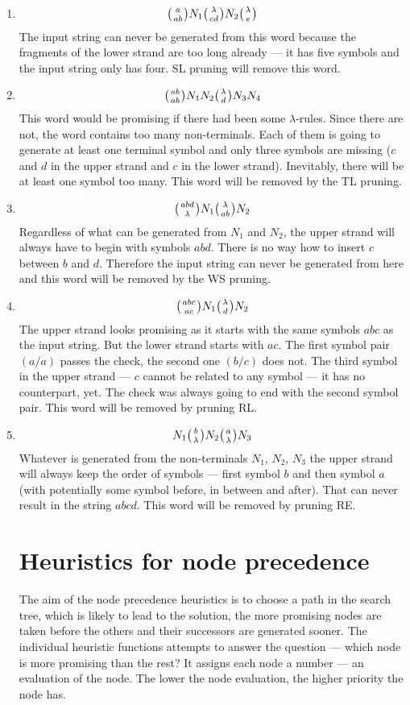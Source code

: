 \begin{enumerate}
\item{
$$\wkpair{a}{ab} N_1 \wkpair{\lambda}{cd} N_2 \wkpair{\lambda}{e}$$
The input string can never be generated from this word because the fragments of the lower strand are too long already --- it has five symbols and the input string only has four. SL pruning will remove this word.
}
\item{
$$\wkpair{ab}{ab} N_1 N_2 \wkpair{\lambda}{d} N_3 N_4$$
This word would be promising if there had been some $\lambda$-rules. Since there are not, the word contains too many non-terminals. Each of them is going to generate at least one terminal symbol and only three symbols are missing ($c$ and $d$ in the upper strand and $c$ in the lower strand). Inevitably, there will be at least one symbol too many. This word will be removed by the TL pruning.
}
\item{
$$\wkpair{abd}{\lambda} N_1 \wkpair{\lambda}{ab} N_2$$
Regardless of what can be generated from $N_1$ and $N_2$, the upper strand will always have to begin with symbols $abd$. There is no way how to insert $c$ between $b$ and $d$. Therefore the input string can never be generated from here and this word will be removed by the WS pruning.
}
\item{
$$\wkpair{abc}{ac} N_1 \wkpair{\lambda}{d} N_2$$
The upper strand looks promising as it starts with the same symbols $abc$ as the input string. But the lower strand starts with $ac$. The first symbol pair $(a/a)$ passes the check, the second one $(b/c)$ does not. The third symbol in the upper strand --- $c$ cannot be related to any symbol --- it has no counterpart, yet. The check was always going to end with the second symbol pair. This word will be removed by pruning RL.
}
\item{
$$N_1 \wkpair{b}{\lambda} N_2 \wkpair{a}{\lambda} N_3$$
Whatever is generated from the non-terminals $N_1$, $N_2$, $N_3$ the upper strand will always keep the order of symbols --- first symbol $b$ and then symbol $a$ (with potentially some symbol before, in between and after). That can never result in the string $abcd$. This word will be removed by pruning RE.
}

\section{Heuristics for node precedence} \label{heur_node_pref}

The aim of the node precedence heuristics is to choose a path in the search tree, which is likely to lead to the solution, the more promising nodes are taken before the others and their successors are generated sooner. The individual heuristic functions attempts to answer the question --- which node is more promising than the rest? It assigns each node a number --- an evaluation of the node. The lower the node evaluation, the higher priority the node has.


\end{enumerate}
